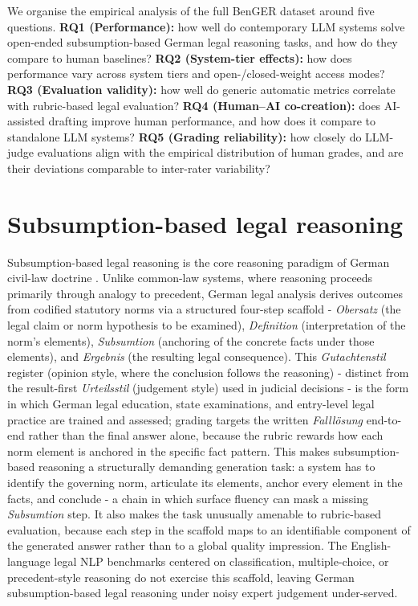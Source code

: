 \documentclass[11pt]{article}
\begin{document}
We organise the empirical analysis of the full BenGER dataset around
five questions. \textbf{RQ1 (Performance):} how well do contemporary LLM
systems solve open-ended subsumption-based German legal reasoning tasks,
and how do they compare to human baselines? \textbf{RQ2 (System-tier
effects):} how does performance vary across system tiers and
open-/closed-weight access modes? \textbf{RQ3 (Evaluation validity):}
how well do generic automatic metrics correlate with rubric-based legal
evaluation? \textbf{RQ4 (Human--AI co-creation):} does AI-assisted
drafting improve human performance, and how does it compare to
standalone LLM systems? \textbf{RQ5 (Grading reliability):} how closely
do LLM-judge evaluations align with the empirical distribution of human
grades, and are their deviations comparable to inter-rater variability?

\section{Subsumption-based legal reasoning}\label{sec-legal-methodology}

Subsumption-based legal reasoning is the core reasoning paradigm of
German civil-law doctrine
\citep{larenz1995methodenlehre, moellers2023methodenlehre}. Unlike
common-law systems, where reasoning proceeds primarily through analogy
to precedent, German legal analysis derives outcomes from codified
statutory norms via a structured four-step scaffold - \emph{Obersatz}
(the legal claim or norm hypothesis to be examined), \emph{Definition}
(interpretation of the norm's elements), \emph{Subsumtion} (anchoring of
the concrete facts under those elements), and \emph{Ergebnis} (the
resulting legal consequence). This \emph{Gutachtenstil} register
(opinion style, where the conclusion follows the reasoning) - distinct
from the result-first \emph{Urteilsstil} (judgement style) used in
judicial decisions - is the form in which German legal education, state
examinations, and entry-level legal practice are trained and assessed;
grading targets the written \emph{Falllösung} end-to-end rather than the
final answer alone, because the rubric rewards how each norm element is
anchored in the specific fact pattern. This makes subsumption-based
reasoning a structurally demanding generation task: a system has to
identify the governing norm, articulate its elements, anchor every
element in the facts, and conclude - a chain in which surface fluency
can mask a missing \emph{Subsumtion} step. It also makes the task
unusually amenable to rubric-based evaluation, because each step in the
scaffold maps to an identifiable component of the generated answer
rather than to a global quality impression. The English-language legal
NLP benchmarks centered on classification, multiple-choice, or
precedent-style reasoning
\citep{chalkidis2022lexglue, guha2023legalbench} do not exercise this
scaffold, leaving German subsumption-based legal reasoning under noisy
expert judgement under-served.
\end{document}
